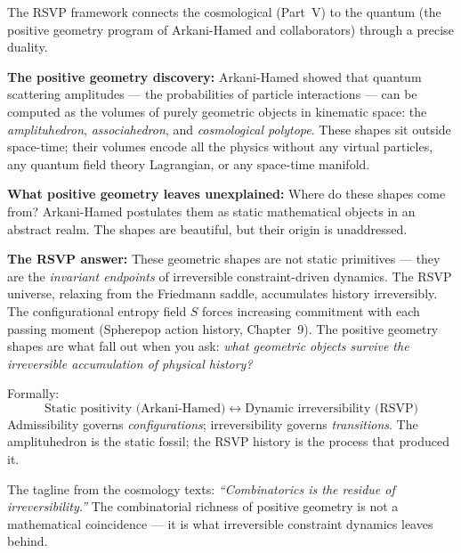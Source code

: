 \begin{tcolorbox}[enhanced, breakable,
  colback=RSVPlight, colframe=RSVPdeep, arc=4pt, boxrule=0.6pt,
  title={\bfseries\sffamily Technical Note: Positive Geometry and RSVP — Bridging the Scales},
  coltitle=white, attach boxed title to top left={yshift=-2mm,xshift=6mm},
  boxed title style={colback=RSVPdeep,sharp corners},
  top=4mm,left=4mm,right=4mm,bottom=4mm]

The RSVP framework connects the cosmological (Part~V) to the quantum
(the positive geometry program of Arkani-Hamed and collaborators) through
a precise duality.

\textbf{The positive geometry discovery:} Arkani-Hamed showed that
quantum scattering amplitudes — the probabilities of particle interactions
— can be computed as the volumes of purely geometric objects in kinematic
space: the \emph{amplituhedron}, \emph{associahedron}, and
\emph{cosmological polytope}. These shapes sit outside space-time; their
volumes encode all the physics without any virtual particles, any quantum
field theory Lagrangian, or any space-time manifold.

\textbf{What positive geometry leaves unexplained:} Where do these shapes
come from? Arkani-Hamed postulates them as static mathematical objects
in an abstract realm. The shapes are beautiful, but their origin is
unaddressed.

\textbf{The RSVP answer:} These geometric shapes are not static primitives
— they are the \emph{invariant endpoints} of irreversible constraint-driven
dynamics. The RSVP universe, relaxing from the Friedmann saddle, accumulates
history irreversibly. The configurational entropy field $S$ forces
increasing commitment with each passing moment (Spherepop action history,
Chapter~9). The positive geometry shapes are what fall out when you ask:
\emph{what geometric objects survive the irreversible accumulation of
physical history?}

Formally:
\[
  \text{Static positivity (Arkani-Hamed)} \;\longleftrightarrow\;
  \text{Dynamic irreversibility (RSVP)}
\]
Admissibility governs \emph{configurations}; irreversibility governs
\emph{transitions}. The amplituhedron is the static fossil;
the RSVP history is the process that produced it.

The tagline from the cosmology texts: \emph{``Combinatorics is the
residue of irreversibility.''} The combinatorial richness of positive
geometry is not a mathematical coincidence — it is what irreversible
constraint dynamics leaves behind.
\end{tcolorbox}


